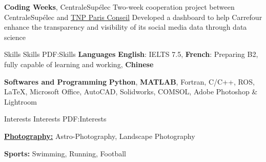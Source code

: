 \documentclass[a4paper,MMMyyyy,nonstopmode]{simpleresumecv}
\begin{document}
\begin{Body}
\Entry
\textbf{Coding Weeks}, CentraleSupélec
\hfill
{}
\Gap
\BulletItem
Two-week cooperation project between CentraleSupélec and \href{https://www.tnpconsultants.com/fr}{TNP Paris Conseil}
\BulletItem
Developed a dashboard to help Carrefour enhance the transparency and visibility of its social media data through data science
\BigGap


\Section
{Skills}
{Skills}
{PDF:Skills}
\Entry
\textbf{Languages}
\Gap
\BulletItem
\textbf{English}: IELTS 7.5, \textbf{French}: Preparing B2, fully capable of learning and working, \textbf{Chinese}

\Gap

\Entry
\textbf{Softwares and Programming}
\Gap
\BulletItem
\textbf{Python},
\textbf{MATLAB},
Fortran,
C/C++,
ROS,
{\LaTeX},
\BulletItem
Microsoft Office, AutoCAD, Solidworks, COMSOL,
Adobe Photoshop \& Lightroom



\Section
{Interests}
{Interests}
{PDF:Interests}

\Entry
\href{https://500px.me/scj16}{\textbf{Photography:}} Astro-Photography, Landscape Photography

\Entry
\textbf{Sports:} Swimming, Running, Football
\end{Body}
\end{document}
